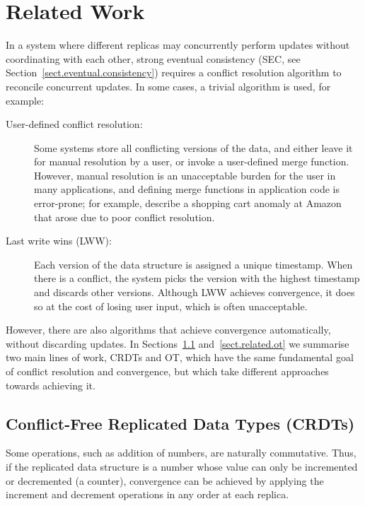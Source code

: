 \section{Related Work}\label{sect.relatedwork}

In a system where different replicas may concurrently perform updates without coordinating with each
other, strong eventual consistency (SEC, see Section~\ref{sect.eventual.consistency}) requires a
conflict resolution algorithm to reconcile concurrent updates. In some cases, a trivial algorithm is
used, for example:

\begin{description}
\item[User-defined conflict resolution:] Some systems store all conflicting versions of the data,
and either leave it for manual resolution by a user, or invoke a user-defined merge function.
However, manual resolution is an unacceptable burden for the user in many applications, and defining
merge functions in application code is error-prone; for example, \citet{DeCandia:2007ui} describe a
shopping cart anomaly at Amazon that arose due to poor conflict resolution.

\item[Last write wins (LWW):] Each version of the data structure is assigned a unique timestamp.
When there is a conflict, the system picks the version with the highest timestamp and discards other
versions. Although LWW achieves convergence, it does so at the cost of losing user input, which is
often unacceptable.
\end{description}

However, there are also algorithms that achieve convergence automatically, without discarding
updates. In Sections~\ref{sect.related.crdts} and~\ref{sect.related.ot} we summarise two main lines
of work, CRDTs and OT, which have the same fundamental goal of conflict resolution and convergence,
but which take different approaches towards achieving it.

\subsection{Conflict-Free Replicated Data Types (CRDTs)}\label{sect.related.crdts}

Some operations, such as addition of numbers, are naturally commutative. Thus, if the replicated
data structure is a number whose value can only be incremented or decremented (a counter),
convergence can be achieved by applying the increment and decrement operations in any order at each
replica.

